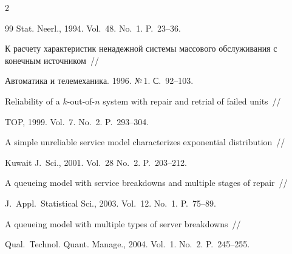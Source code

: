 \begin{multicols}{2}
{{\begin{thebibliography}{99}
Stat. Neerl., 1994. Vol.~48. No.~1. P.~23--36.









К расчету характеристик ненадежной системы массового обслуживания с конечным источником~//


Автоматика и телемеханика. 1996. №\,1. С.\ 92--103.









Reliability of a $k$-out-of-$n$ system with repair and retrial of failed units~//


TOP, 1999. Vol.~7. No.~2. P.~293--304.









A simple unreliable service model characterizes exponential distribution~//


Kuwait J.\ Sci., 2001. Vol.~28 No.~2. P.~203--212.









A queueing model with service breakdowns and multiple stages of repair~//


J.\ Appl.\ Statistical Sci., 2003. Vol.~12. No.~1. P.~75--89.









A queueing model with multiple types of server breakdowns~//


Qual.\ Technol. Quant. Manage., 2004. Vol.~1. No.~2. P.~245--255.










\end{thebibliography}}}
\end{multicols}

